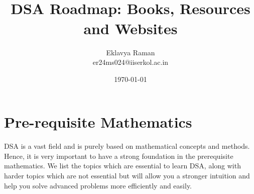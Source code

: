 \documentclass[openany]{book}
\begin{document}
\title{\Large{} \\ \vspace{5pt}
\large{DSA Roadmap: Books, Resources and Websites}}
\author{Eklavya Raman \\ \vspace{5pt} er24ms024@iiserkol.ac.in \\ \vspace{5pt}}
\date{\today}
\maketitle
\tableofcontents
\part{Pre-requisite Mathematics}
\begin{center}
\end{center}
DSA is a vast field and is purely based on mathematical concepts and methods. Hence, it is very important to have a strong foundation in the prerequisite mathematics. We list the topics which are essential to learn DSA, along with harder topics which are not essential but will allow you a stronger intuition and help you solve advanced problems more efficiently and easily. 
\end{document}
